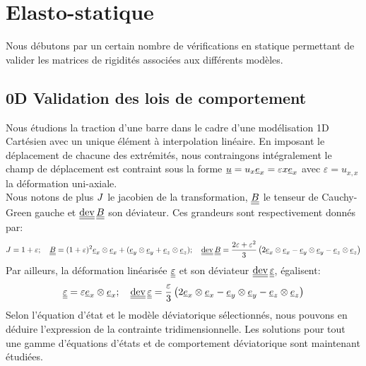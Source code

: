 \documentclass[10pt]{book}
\begin{document}
\section{Elasto-statique}
Nous débutons par un certain nombre de vérifications en statique permettant de valider les matrices de rigidités associées aux différents modèles.
\subsection{0D Validation des lois de comportement}
Nous étudions la traction d'une barre dans le cadre d'une modélisation 1D Cartésien avec un unique élément à interpolation linéaire. En imposant le déplacement de chacune des extrémités, nous contraingons intégralement le champ de déplacement est contraint sous la forme $\underline{u}=u_{x}\underline{e}_{x}=\varepsilon x \underline{e}_{x}$ avec $\varepsilon = u_{x,x}$ la déformation uni-axiale.\\

Nous notons de plus $J$ le jacobien de la transformation, $\underline{\underline{B}}$ le tenseur de Cauchy-Green gauche et $\dev\CGG$ son déviateur. Ces grandeurs sont respectivement donnés par:
\begin{equation}
\J=1+\varepsilon;\quad \CGG = (1+\varepsilon)^{2}\ex\otimes\ex+(\ey\otimes\ey+\ez\otimes\ez); \quad \dev\CGG = \dfrac{2\varepsilon+\varepsilon^{2}}{3}\left(2\ex\otimes\ex-\ey\otimes\ey-\ez\otimes\ez\right)
\label{eq:JBDEVB_1D_Cartesien}
\end{equation}
Par ailleurs, la déformation linéarisée $\underline{\underline{\varepsilon}}$ et son déviateur $\dev\DefoHPP$, égalisent:
$$\DefoHPP = \varepsilon\ex\otimes\ex; \quad \dev\DefoHPP = \dfrac{\varepsilon}{3}\left(2\ex\otimes\ex-\ey\otimes\ey-\ez\otimes\ez\right)$$
Selon l'équation d'état et le modèle déviatorique sélectionnés, nous pouvons en déduire l'expression de la contrainte tridimensionnelle. Les solutions pour tout une gamme d'équations d'états et de comportement déviatorique sont maintenant étudiées.
\end{document}
